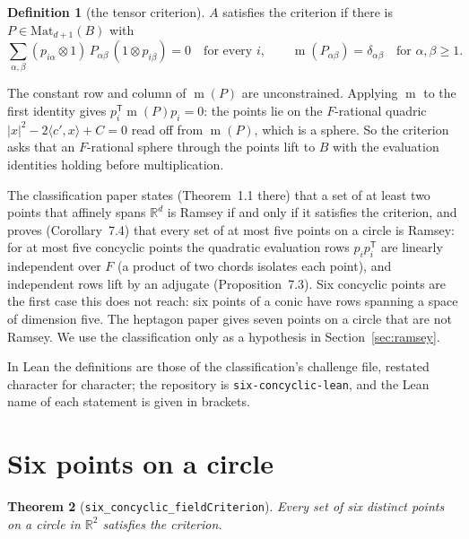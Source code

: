 \documentclass[11pt]{article}
\newtheorem{theorem}{Theorem}
\theoremstyle{definition}
\newtheorem{definition}[theorem]{Definition}
\theoremstyle{remark}
\newcommand{\R}{\mathbb{R}}
\newcommand{\B}{B}
\DeclareMathOperator{\m}{m}
\begin{document}
\begin{definition}[the tensor criterion]\label{def:crit}
$A$ satisfies the criterion if there is $P \in \mathrm{Mat}_{d+1}(\B)$ with
\[
\sum_{\alpha,\beta} (p_{i\alpha} \otimes 1)\, P_{\alpha\beta}\, (1 \otimes p_{i\beta}) = 0
\quad\text{for every } i,
\qquad
\m(P_{\alpha\beta}) = \delta_{\alpha\beta} \quad\text{for } \alpha, \beta \geq 1 .
\]
\end{definition}

The constant row and column of $\m(P)$ are unconstrained. Applying $\m$ to the first identity gives
$p_i^{\mathsf T} \m(P) p_i = 0$: the points lie on the $F$-rational quadric $|x|^2 - 2\langle c', x\rangle + C = 0$
read off from $\m(P)$, which is a sphere. So the criterion asks that an $F$-rational sphere through
the points lift to $\B$ with the evaluation identities holding before multiplication.

The classification paper \cite{oai} states (Theorem~1.1 there) that a set of at least two points that
affinely spans $\R^d$ is Ramsey if and only if it satisfies the criterion, and proves (Corollary~7.4)
that every set of at most five points on a circle is Ramsey: for at most five concyclic points the
quadratic evaluation rows $p_i p_i^{\mathsf T}$ are linearly independent over $F$ (a product of two
chords isolates each point), and independent rows lift by an adjugate (Proposition~7.3). Six
concyclic points are the first case this does not reach: six points of a conic have rows spanning a
space of dimension five. The heptagon paper \cite{palvolgyi} gives seven points on a circle that are
not Ramsey. We use the classification only as a hypothesis in Section~\ref{sec:ramsey}.

In Lean the definitions are those of the classification's challenge file, restated character for
character; the repository is \texttt{six-concyclic-lean}, and the Lean name of each statement is given
in brackets.

\section{Six points on a circle}\label{sec:six}

\begin{theorem}[\texttt{six\_concyclic\_fieldCriterion}]\label{thm:six}
Every set of six distinct points on a circle in $\R^2$ satisfies the criterion.
\end{theorem}
\end{document}
